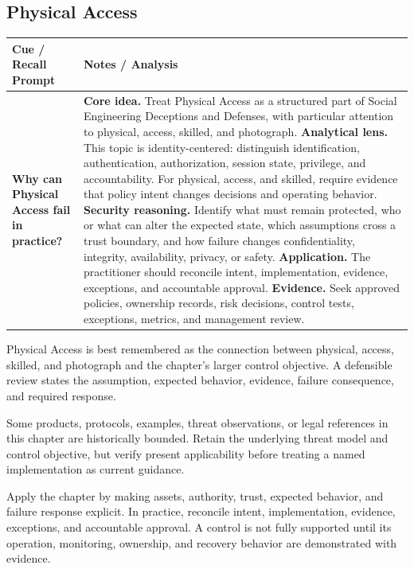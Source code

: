 \documentclass[11pt]{article}
\newcommand{\CornellHeader}{%
\rowcolor{Navy}\color{white}\bfseries Cue / Recall Prompt & \color{white}\bfseries Notes / Analysis\\\hline}
\newcommand{\CornellRow}[2]{%
\cellcolor{CueGray}\RaggedRight\textbf{#1} & \RaggedRight #2\\\hline}
\begin{document}
\subsection*{Physical Access}
\begin{longtable}{>{\RaggedRight\arraybackslash}p{}|>{\RaggedRight\arraybackslash}p{}}
\CornellHeader
\CornellRow{Why can Physical Access fail in practice?}{\textbf{Core idea.} Treat Physical Access as a structured part of Social Engineering Deceptions and Defenses, with particular attention to physical, access, skilled, and photograph. \textbf{Analytical lens.} This topic is identity-centered: distinguish identification, authentication, authorization, session state, privilege, and accountability. For physical, access, and skilled, require evidence that policy intent changes decisions and operating behavior. \textbf{Security reasoning.} Identify what must remain protected, who or what can alter the expected state, which assumptions cross a trust boundary, and how failure changes confidentiality, integrity, availability, privacy, or safety. \textbf{Application.} The practitioner should reconcile intent, implementation, evidence, exceptions, and accountable approval. \textbf{Evidence.} Seek approved policies, ownership records, risk decisions, control tests, exceptions, metrics, and management review.}
\end{longtable}
\begin{topicsummary}
Physical Access is best remembered as the connection between physical, access, skilled, and photograph and the chapter's larger control objective. A defensible review states the assumption, expected behavior, evidence, failure consequence, and required response.
\end{topicsummary}
\begin{historybox}
Some products, protocols, examples, threat observations, or legal references in this chapter are historically bounded. Retain the underlying threat model and control objective, but verify present applicability before treating a named implementation as current guidance.
\end{historybox}
\begin{defensebox}
Apply the chapter by making assets, authority, trust, expected behavior, and failure response explicit. In practice, reconcile intent, implementation, evidence, exceptions, and accountable approval. A control is not fully supported until its operation, monitoring, ownership, and recovery behavior are demonstrated with evidence.
\end{defensebox}
\end{document}
